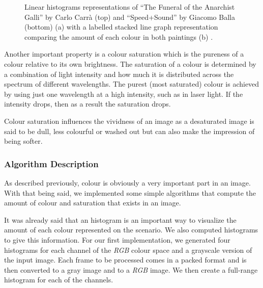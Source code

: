 \begin{figure}[htb]
	\centering
  \caption{Linear histograms representations of “The Funeral of the Anarchist Galli” by Carlo Carrà (top) and “Speed+Sound” by Giacomo Balla (bottom) (a) with a labelled stacked line graph representation comparing the amount of each colour in both paintings (b) \cite{haber2011colourvis}.}
  \label{fig:colourvis2}
\end{figure}

Another important property is a colour saturation which is the pureness of a colour relative to its own brightness. The saturation of a colour is determined by a combination of light intensity and how much it is distributed across the spectrum of different wavelengths. The purest (most saturated) colour is achieved by using just one wavelength at a high intensity, such as in laser light. If the intensity drops, then as a result the saturation drops.

Colour saturation influences the vividness of an image as a desaturated image is said to be dull, less colourful or washed out but can also make the impression of being softer. 


\subsubsection{Algorithm Description}

As described previously, colour is obviously a very important part in an image. With that being said, we implemented some simple algorithms that compute the amount of colour and saturation that exists in an image.

It was already said that an histogram is an important way to visualize the amount of each colour represented on the scenario. We also computed histograms to give this information. For our first implementation, we generated four histograms for each channel of the \emph{RGB} colour space and a grayscale version of the input image. Each frame to be processed comes in a packed format and is then converted to a gray image and to a \emph{RGB} image. We then create a full-range histogram for each of the channels.

